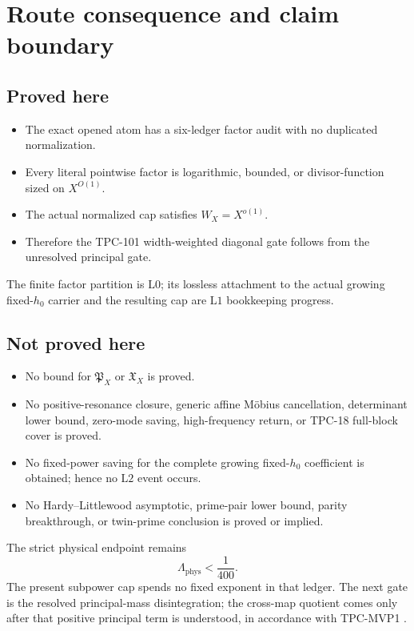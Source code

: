\documentclass[11pt]{article}
\theoremstyle{definition}
\theoremstyle{remark}
\newcommand{\Lzero}{\mathrm{L0}}
\newcommand{\Lone}{\mathrm{L1}}
\newcommand{\Ltwo}{\mathrm{L2}}
\newcommand{\PX}{\mathfrak P_X}
\newcommand{\XX}{\mathfrak X_X}
\begin{document}
\section{Route consequence and claim boundary}
\label{sec:boundary}

\subsection*{Proved here}

\begin{itemize}[leftmargin=2em]
\item The exact opened atom has a six-ledger factor audit with no
duplicated normalization.
\item Every literal pointwise factor is logarithmic, bounded, or
divisor-function sized on \(X^{O(1)}\).
\item The actual normalized cap satisfies \(W_X=X^{o(1)}\).
\item Therefore the TPC-101 width-weighted diagonal gate follows
from the unresolved principal gate.
\end{itemize}

The finite factor partition is \(\Lzero\); its lossless attachment
to the actual growing fixed-\(h_0\) carrier and the resulting cap
are \(\Lone\) bookkeeping progress.

\subsection*{Not proved here}

\begin{itemize}[leftmargin=2em]
\item No bound for \(\PX\) or \(\XX\) is proved.
\item No positive-resonance closure, generic affine M\"obius
cancellation, determinant lower bound, zero-mode saving,
high-frequency return, or TPC-18 full-block cover is proved.
\item No fixed-power saving for the complete growing fixed-\(h_0\)
coefficient is obtained; hence no \(\Ltwo\) event occurs.
\item No Hardy--Littlewood asymptotic, prime-pair lower bound,
parity breakthrough, or twin-prime conclusion is proved or implied.
\end{itemize}

The strict physical endpoint remains
\[
 \Lambda_{\mathrm{phys}}<\frac1{400}.
\]
The present subpower cap spends no fixed exponent in that ledger.
The next gate is the resolved principal-mass disintegration; the
cross-map quotient comes only after that positive principal term is
understood, in accordance with TPC-MVP1
\citep{WangTPCMVP1}.

\begingroup
\footnotesize
\raggedright


\endgroup
\end{document}
